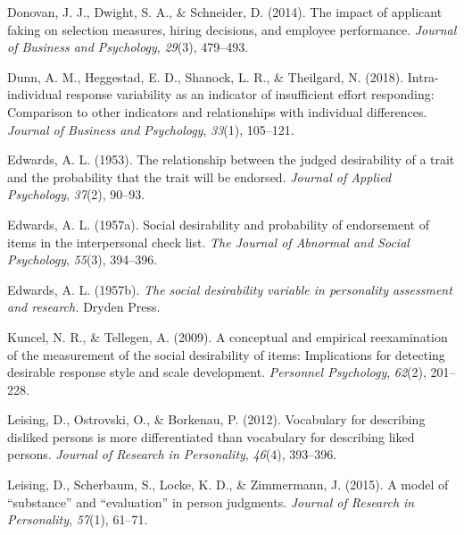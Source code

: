 \documentclass[
  ,jou]{apa6}
\newlength{\cslhangindent}
\newlength{\cslentryspacingunit} %
\newenvironment{CSLReferences}[2] %
 {%
  \setlength{\parindent}{0pt}
  \ifodd #1
  \let\oldpar\par
  \def\par{\hangindent=\cslhangindent\oldpar}
  \fi
  \setlength{\parskip}{#2\cslentryspacingunit}
 }%
 {}
\begin{document}
\begin{CSLReferences}{1}{0}
\leavevmode{}%
Donovan, J. J., Dwight, S. A., \& Schneider, D. (2014). The impact of applicant faking on selection measures, hiring decisions, and employee performance. \emph{Journal of Business and Psychology}, \emph{29}(3), 479--493.

\leavevmode{}%
Dunn, A. M., Heggestad, E. D., Shanock, L. R., \& Theilgard, N. (2018). Intra-individual response variability as an indicator of insufficient effort responding: Comparison to other indicators and relationships with individual differences. \emph{Journal of Business and Psychology}, \emph{33}(1), 105--121.

\leavevmode{}%
Edwards, A. L. (1953). The relationship between the judged desirability of a trait and the probability that the trait will be endorsed. \emph{Journal of Applied Psychology}, \emph{37}(2), 90--93.

\leavevmode{}%
Edwards, A. L. (1957a). Social desirability and probability of endorsement of items in the interpersonal check list. \emph{The Journal of Abnormal and Social Psychology}, \emph{55}(3), 394--396.

\leavevmode{}%
Edwards, A. L. (1957b). \emph{The social desirability variable in personality assessment and research.} Dryden Press.

\leavevmode{}%
Kuncel, N. R., \& Tellegen, A. (2009). A conceptual and empirical reexamination of the measurement of the social desirability of items: Implications for detecting desirable response style and scale development. \emph{Personnel Psychology}, \emph{62}(2), 201--228.

\leavevmode{}%
Leising, D., Ostrovski, O., \& Borkenau, P. (2012). Vocabulary for describing disliked persons is more differentiated than vocabulary for describing liked persons. \emph{Journal of Research in Personality}, \emph{46}(4), 393--396.

\leavevmode{}%
Leising, D., Scherbaum, S., Locke, K. D., \& Zimmermann, J. (2015). A model of {``substance''} and {``evaluation''} in person judgments. \emph{Journal of Research in Personality}, \emph{57}(1), 61--71.


\end{CSLReferences}
\end{document}
